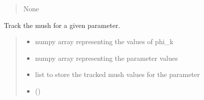 \documentclass[a4paper,11pt,english,openany]{sphinxmanual}
\begin{document}
\begin{fulllineitems}
\begin{fulllineitems}
\begin{quote}
\begin{description}
\begin{itemize}
\end{itemize}

\sphinxAtStartPar
None

\end{description}\end{quote}

\end{fulllineitems}


\begin{fulllineitems}
\label{\detokenize{api/spyice.models.sea_ice_model:src.spyice.models.sea_ice_model.SeaIceModel.track_mush_for_parameter}}
\pysigstartsignatures
\pysiglinewithargsret
{}
{\sphinxparamcomma {}\sphinxparamcomma {}}
{}
\pysigstopsignatures
\sphinxAtStartPar
Track the mush for a given parameter.
\begin{quote}\begin{description}
\begin{itemize}
\item {} 
\sphinxAtStartPar
{} \textendash{} numpy array representing the values of phi\_k

\item {} 
\sphinxAtStartPar
{} \textendash{} numpy array representing the parameter values

\item {} 
\sphinxAtStartPar
{} \textendash{} list to store the tracked mush values for the parameter

\item {} 
\sphinxAtStartPar
{} ()

\end{itemize}

\end{description}\end{quote}

\end{fulllineitems}


\end{fulllineitems}
\end{document}
